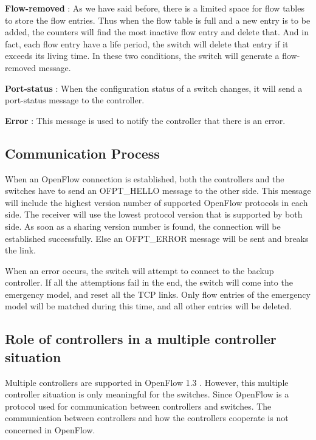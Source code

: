 \textbf{Flow-removed} : As we have said before, there is a limited space for flow tables to store the flow entries. Thus when the flow table is full and a new entry is to be added, the counters will find the most inactive flow entry and delete that. And in fact, each flow entry have a life period, the switch will delete that entry if it exceeds its living time. In these two conditions, the switch will generate a flow-removed message.

\textbf{Port-status} : When the configuration status of a switch changes, it will send a port-status message to the controller.

\textbf{Error} : This message is used to notify the controller that there is an error.

\subsection{Communication Process}
\label{sec:Communication Process}

When an OpenFlow connection is established, both the controllers and the switches have to send an OFPT\_HELLO message to the other side. This message will include the highest version number of supported OpenFlow protocols in each side. The receiver will use the lowest protocol version that is supported by both side. As soon as a sharing version number is found, the connection will be established successfully. Else an OFPT\_ERROR message will be sent and breaks the link.

When an error occurs, the switch will attempt to connect to the backup controller. If all the attemptions fail in the end, the switch will come into the emergency model, and reset all the TCP links. Only flow entries of the emergency model will be matched during this time, and all other entries will be deleted.

\subsection{Role of controllers in a multiple controller situation}
\label{sec:Role of controllers in a multiple controller situation}

Multiple controllers are supported in OpenFlow 1.3 \cite{opproto}. However, this multiple controller situation is only meaningful for the switches. Since OpenFlow is a protocol used for communication between controllers and switches. The communication between controllers and how the controllers cooperate is not concerned in OpenFlow.

